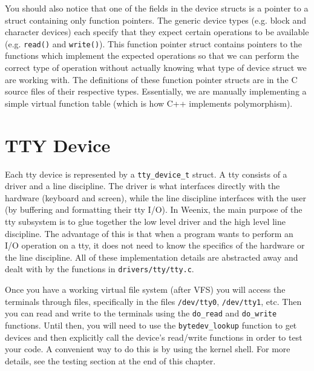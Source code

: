 You should also notice that one of the fields in the device structs is a pointer to a struct containing only function pointers. The generic device types (e.g. block and character devices) each specify that they expect certain operations to be available (e.g. \texttt{read()} and \texttt{write()}). This function pointer struct contains pointers to the functions which implement the expected operations so that we can perform the correct type of operation without actually knowing what type of device struct we are working with. The definitions of these function pointer structs are in the C source files of their respective types. Essentially, we are manually implementing a simple virtual function table (which is how C++ implements polymorphism). 

\section{TTY Device}

Each tty device is represented by a \texttt{tty\_device\_t} struct. A tty consists of a driver and a line discipline. The driver is what interfaces directly with the hardware (keyboard and screen), while the line discipline interfaces with the user (by buffering and formatting their tty I/O). In Weenix, the main purpose of the tty subsystem is to glue together the low level driver and the high level line discipline. The advantage of this is that when a program wants to perform an I/O operation on a tty, it does not need to know the specifics of the hardware or the line discipline. All of these implementation details are abstracted away and dealt with by the functions in \texttt{drivers/tty/tty.c}.

Once you have a working virtual file system (after VFS) you will access the terminals through files, specifically in the files \texttt{/dev/tty0}, \texttt{/dev/tty1}, etc. Then you can read and write to the terminals using the \texttt{do\_read} and \texttt{do\_write} functions. Until then, you will need to use the \texttt{bytedev\_lookup} function to get devices and then explicitly call the device's read/write functions in order to test your code. A convenient way to do this is by using the kernel shell. For more details, see the testing section at the end of this chapter. 

